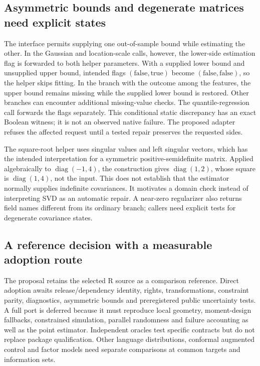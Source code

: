 \subsection{Asymmetric bounds and degenerate matrices need explicit states}
The interface permits supplying one out-of-sample bound while estimating
the other. In the Gaussian and location-scale calls, however, the
lower-side estimation flag is forwarded to both helper parameters.
With a supplied lower bound and unsupplied upper bound, intended flags
$(\mathrm{false},\mathrm{true})$ become
$(\mathrm{false},\mathrm{false})$, so the helper skips fitting. In the
branch with the outcome among the features, the upper bound remains
missing while the supplied lower bound is restored. Other branches can
encounter additional missing-value checks. The quantile-regression call
forwards the flags separately. This conditional static discrepancy has
an exact Boolean witness; it is not an observed native failure. The
proposed adapter refuses the affected request until a tested repair
preserves the requested sides.\citep{exec24_scpi_source,exec24_scpi_choice}

The square-root helper uses singular values and left singular vectors,
which has the intended interpretation for a symmetric positive-semidefinite
matrix. Applied algebraically to $\operatorname{diag}(-1,4)$, the
construction gives $\operatorname{diag}(1,2)$, whose square is
$\operatorname{diag}(1,4)$, not the input. This does not establish that the
estimator normally supplies indefinite covariances. It motivates a domain
check instead of interpreting SVD as an automatic repair. A near-zero
regularizer also returns field names different from its ordinary branch;
callers need explicit tests for degenerate covariance states.
\citep{exec24_scpi_source,exec24_scpi_choice}

\subsection{A reference decision with a measurable adoption route}
The proposal retains the selected R source as a comparison reference.
Direct adoption awaits release/dependency identity, rights, transformations,
constraint parity, diagnostics, asymmetric bounds and preregistered public
uncertainty tests. A full port is deferred because it must reproduce local
geometry, moment-design fallbacks, constrained simulation, parallel
randomness and failure accounting as well as the point estimator.
Independent oracles test specific contracts but do not replace package
qualification. Other language distributions, conformal augmented control
and factor models need separate comparisons at common targets and
information sets.\citep{exec24_scpi_choice}

